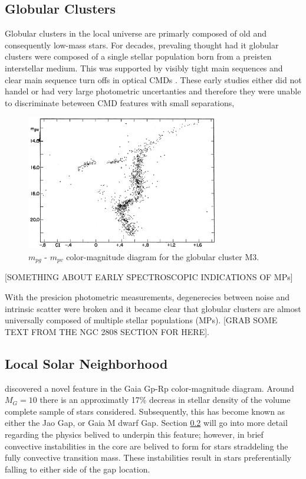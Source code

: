 \subsection{Globular Clusters}

Globular clusters in the local universe are primarly composed of old and
consequently low-mass stars. For decades, prevaling thought had it globular
clusters were composed of a single stellar population born from a preisten
interstellar medium. This was supported by visibly tight main sequences and
clear main sequence turn offs in optical CMDs \citep[Figure
\ref{fig:M3CMD},][]{Sandage1953}. These early studies either did not handel or
had very large photometric uncertanties and therefore they were unable to
discriminate beteween CMD features with small separations,

\begin{figure}
	\centering
	\includegraphics[width=0.75\textwidth]{src/Figures/Gould53.png}
	\caption{$m_{pg}$ - $m_{pv}$ color-magnitude diagram for the globular cluster M3.}
	\label{fig:M3CMD}
\end{figure}

[SOMETHING ABOUT EARLY SPECTROSCOPIC INDICATIONS OF MPs]

With the presicion photometric measurements, degenerecies between noise and
intrinsic scatter were broken and it became clear that globular clusters are
almost universally composed of multiple stellar populations (MPs). [GRAB SOME
TEXT FROM THE NGC 2808 SECTION FOR HERE].

\subsection{Local Solar Neighborhood}
\citet{Jao2018} discovered a novel feature in the Gaia Gp-Rp color-magnitude
diagram. Around $M_{G}=10$ there is an approximatly 17\% decreas in stellar
density of the volume complete sample of stars \citeauthor{Jao2018} considered.
Subsequently, this has become known as either the Jao Gap, or Gaia M dwarf Gap.
Section \ref{} will go into more detail regarding the physics belived to
underpin this feature; however, in brief convective instabilities in the core
are belived to form for stars straddeling the fully convective transition mass.
These instabilities result in stars preferentially falling to either side of
the gap location.

